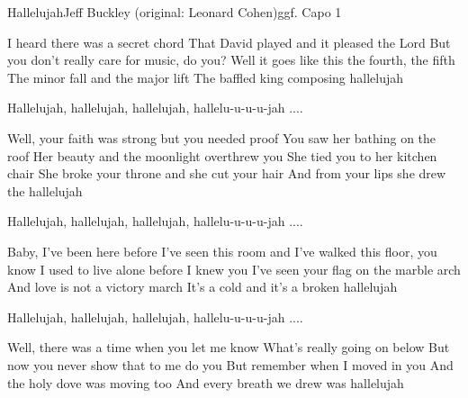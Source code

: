 \begin{song}{Hallelujah}{Jeff Buckley (original: Leonard Cohen)}{ggf. Capo 1}


I heard there was a secret chord
That David played and it pleased the Lord
But you don't really care for music, do you?
Well it goes like this the fourth, the fifth
The minor fall and the major lift
The baffled king composing hallelujah

Hallelujah, hallelujah, hallelujah, hallelu-u-u-u-jah ....

Well, your faith was strong but you needed proof
You saw her bathing on the roof
Her beauty and the moonlight overthrew you
She tied you to her kitchen chair
She broke your throne and she cut your hair
And from your lips she drew the hallelujah

Hallelujah, hallelujah, hallelujah, hallelu-u-u-u-jah ....

Baby, I've been here before
I've seen this room and I've walked this floor, you know
I used to live alone before I knew you
I've seen your flag on the marble arch
And love is not a victory march
It's a cold and it's a broken hallelujah

Hallelujah, hallelujah, hallelujah, hallelu-u-u-u-jah ....

Well, there was a time when you let me know
What's really going on below
But now you never show that to me do you
But remember when I moved in you
And the holy dove was moving too
And every breath we drew was hallelujah


\end{song}
